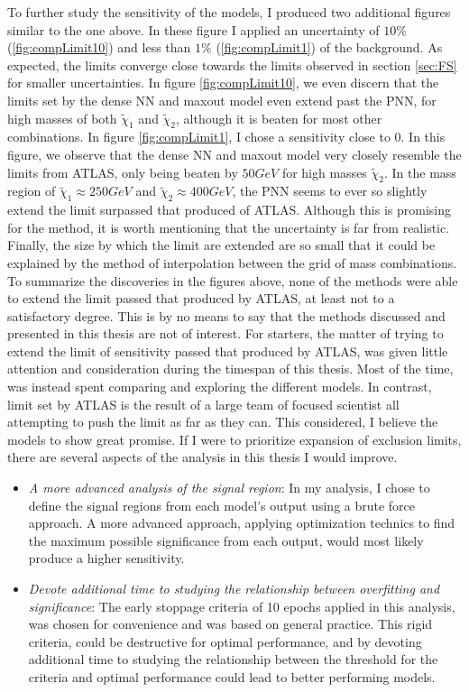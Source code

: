 To further study the sensitivity of the models, I produced two additional figures similar to the one above. In these figure I applied an uncertainty of 
$10\%$ (\ref{fig:compLimit10}) and less than $1\%$ (\ref{fig:compLimit1}) of the background. As expected, the limits converge close towards the limits 
observed in section \ref{sec:FS} for smaller uncertainties. In figure \ref{fig:compLimit10}, we even discern that the limits set by the dense \ac{NN}
and maxout model even extend past the \ac{PNN}, for high masses of both $\tilde{\chi}_1$ and $\tilde{\chi}_2$, although it is beaten for most other combinations.
In figure \ref{fig:compLimit1}, I chose a sensitivity close to 0. In this figure, we observe that the dense \ac{NN} and maxout model 
very closely resemble the limits from ATLAS, only being beaten by $50GeV$ for high masses $\tilde{\chi}_2$. In the mass region of
$\tilde{\chi}_1\approx250GeV$ and $\tilde{\chi}_2\approx400GeV$, the \ac{PNN} seems to ever so slightly extend the limit surpassed that produced of ATLAS.
Although this is promising for the method, it is worth mentioning that the uncertainty is far from realistic. Finally, the size by which the limit are extended
are so small that it could be explained by the method of interpolation between the grid of mass combinations.
\\
To summarize the discoveries in the figures above, none of the methods were able to extend the limit passed that produced by ATLAS, at least not to a satisfactory degree.
This is by no means to say that the methods discussed and presented in this thesis are not of interest. For starters, the matter of trying to extend the limit of sensitivity 
passed that produced by ATLAS, was given little attention and consideration during the timespan of this thesis. Most of the time, was instead spent comparing and exploring the 
different models. In contrast, limit set by ATLAS is the result of a large team of focused scientist all attempting to push the limit as far as they can. This considered, I believe 
the models to show great promise. If I were to prioritize expansion of exclusion limits, there are several aspects of the analysis in this thesis I would improve.
\begin{itemize}
    \item \emph{A more advanced analysis of the signal region}: In my analysis, I chose to define the signal regions from each model's output using a brute force approach. 
          A more advanced approach, applying optimization technics to find the maximum possible significance from each output, would most likely produce a higher sensitivity.
    \item \emph{Devote additional time to studying the relationship between overfitting and significance}: The early stoppage criteria of 10 epochs applied in this analysis, was chosen 
          for convenience and was based on general practice. This rigid criteria, could be destructive for optimal performance, and by devoting additional time to studying
          the relationship between the threshold for the criteria and optimal performance could lead to better performing models.
          
\end{itemize}

